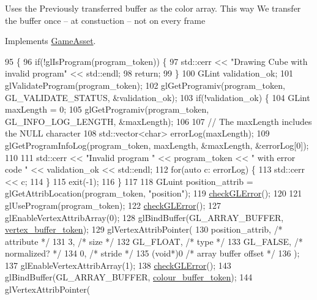 Uses the Previously transferred buffer as the color array. This way We transfer the buffer once -- at constuction -- not on every frame

Implements \hyperlink{classGameAsset_a961aa51ca0a9961fc584c0b5d5431300}{Game\+Asset}.


\begin{DoxyCode}
95                                            \{
96   \textcolor{keywordflow}{if}(!glIsProgram(program\_token)) \{
97     std::cerr << \textcolor{stringliteral}{"Drawing Cube with invalid program"} << std::endl;
98     \textcolor{keywordflow}{return};
99   \}
100   GLint validation\_ok;
101   glValidateProgram(program\_token);
102   glGetProgramiv(program\_token, GL\_VALIDATE\_STATUS, &validation\_ok);
103   \textcolor{keywordflow}{if}(!validation\_ok) \{
104     GLint maxLength = 0;
105     glGetProgramiv(program\_token, GL\_INFO\_LOG\_LENGTH, &maxLength);
106 
107     \textcolor{comment}{// The maxLength includes the NULL character}
108     std::vector<char> errorLog(maxLength);
109     glGetProgramInfoLog(program\_token, maxLength, &maxLength, &errorLog[0]);
110 
111     std::cerr << \textcolor{stringliteral}{"Invalid program "} << program\_token << \textcolor{stringliteral}{" with error code "} << validation\_ok << std::endl;
112     \textcolor{keywordflow}{for}(\textcolor{keyword}{auto} c: errorLog) \{
113       std::cerr << c;
114     \}
115     exit(-1);
116   \}
117 
118   GLuint position\_attrib = glGetAttribLocation(program\_token, \textcolor{stringliteral}{"position"});
119   \hyperlink{GroundAsset_8cc_a75f201b0e53e68726854997957322b8d}{checkGLError}();
120 
121   glUseProgram(program\_token);
122   \hyperlink{GroundAsset_8cc_a75f201b0e53e68726854997957322b8d}{checkGLError}();
127   glEnableVertexAttribArray(0);
128   glBindBuffer(GL\_ARRAY\_BUFFER, \hyperlink{classGroundAsset_a32dbd8507aff2931228318f84160e493}{vertex\_buffer\_token});
129   glVertexAttribPointer(
130     position\_attrib,        \textcolor{comment}{/* attribute */}
131     3,        \textcolor{comment}{/* size */}
132     GL\_FLOAT,   \textcolor{comment}{/* type */}
133     GL\_FALSE,   \textcolor{comment}{/* normalized? */}
134     0,        \textcolor{comment}{/* stride */}
135     (\textcolor{keywordtype}{void}*)0    \textcolor{comment}{/* array buffer offset */}
136   );
137   glEnableVertexAttribArray(1);
138   \hyperlink{GroundAsset_8cc_a75f201b0e53e68726854997957322b8d}{checkGLError}();
143   glBindBuffer(GL\_ARRAY\_BUFFER, \hyperlink{classGroundAsset_acae5e4f08e295851822c3dbb3c10f2ee}{colour\_buffer\_token});
144   glVertexAttribPointer(

\end{DoxyCode}
